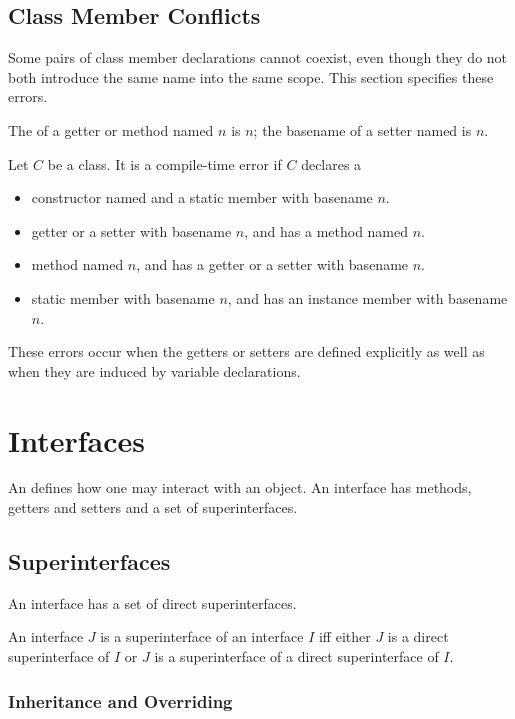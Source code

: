 \documentclass[makeidx]{article}
\begin{document}
\subsection{Class Member Conflicts}

\LMHash{}%
Some pairs of class member declarations cannot coexist,
even though they do not both introduce the same name into the same scope.
This section specifies these errors.

\LMHash{}%
The  of a getter or method named $n$ is $n$;
the basename of a setter named  is $n$.

\LMHash{}%
Let $C$ be a class.
It is a compile-time error if $C$ declares a
\begin{itemize}
\item constructor named  and a static member with basename $n$.
\item getter or a setter with basename $n$, and has a method named $n$.
\item method named $n$, and has a getter or a setter with basename $n$.
\item static member with basename $n$, and has an instance member with basename $n$.
\end{itemize}
These errors occur when the getters or setters are defined explicitly
as well as when they are induced by variable declarations.


\section{Interfaces}

\LMHash{}%
An  defines how one may interact with an object.
An interface has methods, getters and setters and a set of superinterfaces.


\subsection{Superinterfaces}

\LMHash{}%
An interface has a set of direct superinterfaces.

\LMHash{}%
An interface $J$ is a superinterface of an interface $I$ if{}f either $J$ is a direct superinterface of $I$ or $J$ is a superinterface of a direct superinterface of $I$.


\subsubsection{Inheritance and Overriding}
\end{document}
